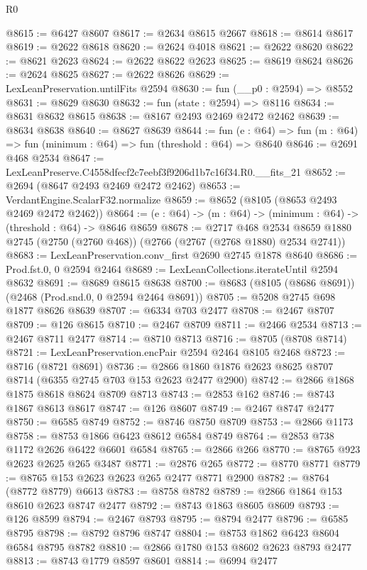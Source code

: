 \begin{lexlean}{R0}
\begin{coremodule}
@8615 := @6427 @8607
@8617 := @2634 @8615 @2667
@8618 := @8614 @8617
@8619 := @2622 @8618
@8620 := @2624 @4018
@8621 := @2622 @8620
@8622 := @8621 @2623
@8624 := @2622 @8622 @2623
@8625 := @8619 @8624
@8626 := @2624 @8625
@8627 := @2622 @8626
@8629 := LexLeanPreservation.untilFits @2594
@8630 := fun (__p0 : @2594) => @8552
@8631 := @8629 @8630
@8632 := fun (state : @2594) => @8116
@8634 := @8631 @8632 @8615
@8638 := @8167 @2493 @2469 @2472 @2462
@8639 := @8634 @8638
@8640 := @8627 @8639
@8644 := fun (e : @64) => fun (m : @64) => fun (minimum : @64) => fun (threshold : @64) => @8640
@8646 := @2691 @468 @2534
@8647 := LexLeanPreserve.C4558dfecf2c7eebf3f9206d1b7c16f34.R0.__fits_21
@8652 := @2694 (@8647 @2493 @2469 @2472 @2462)
@8653 := VerdantEngine.ScalarF32.normalize
@8659 := @8652 (@8105 (@8653 @2493 @2469 @2472 @2462))
@8664 := (e : @64) -> (m : @64) -> (minimum : @64) -> (threshold : @64) -> @8646 @8659
@8678 := @2717
    @468
    @2534
    @8659
    @1880
    @2745
    (@2750 (@2760 @468))
    (@2766 (@2767 (@2768 @1880) @2534 @2741))
@8683 := LexLeanPreservation.conv_first @2690 @2745 @1878 @8640
@8686 := Prod.fst.{0, 0} @2594 @2464
@8689 := LexLeanCollections.iterateUntil @2594 @8632
@8691 := @8689 @8615 @8638
@8700 := @8683 (@8105 (@8686 @8691)) (@2468 (Prod.snd.{0, 0} @2594 @2464 @8691))
@8705 := @5208 @2745 @698 @1877 @8626 @8639
@8707 := @6334 @703 @2477
@8708 := @2467 @8707
@8709 := @126 @8615
@8710 := @2467 @8709
@8711 := @2466 @2534
@8713 := @2467 @8711 @2477
@8714 := @8710 @8713
@8716 := @8705 (@8708 @8714)
@8721 := LexLeanPreservation.encPair @2594 @2464 @8105 @2468
@8723 := @8716 (@8721 @8691)
@8736 := @2866 @1860 @1876 @2623 @8625 @8707 @8714 (@6355 @2745 @703 @153 @2623 @2477 @2900)
@8742 := @2866 @1868 @1875 @8618 @8624 @8709 @8713
@8743 := @2853 @162
@8746 := @8743 @1867 @8613 @8617
@8747 := @126 @8607
@8749 := @2467 @8747 @2477
@8750 := @6585 @8749
@8752 := @8746 @8750 @8709
@8753 := @2866 @1173
@8758 := @8753 @1866 @6423 @8612 @6584 @8749
@8764 := @2853 @738 @1172 @2626 @6422 @6601 @6584
@8765 := @2866 @266
@8770 := @8765 @923 @2623 @2625 @265 @3487
@8771 := @2876 @265
@8772 := @8770 @8771
@8779 := @8765 @153 @2623 @2623 @265 @2477 @8771 @2900
@8782 := @8764 (@8772 @8779) @6613
@8783 := @8758 @8782
@8789 := @2866 @1864 @153 @8610 @2623 @8747 @2477
@8792 := @8743 @1863 @8605 @8609
@8793 := @126 @8599
@8794 := @2467 @8793
@8795 := @8794 @2477
@8796 := @6585 @8795
@8798 := @8792 @8796 @8747
@8804 := @8753 @1862 @6423 @8604 @6584 @8795 @8782
@8810 := @2866 @1780 @153 @8602 @2623 @8793 @2477
@8813 := @8743 @1779 @8597 @8601
@8814 := @6994 @2477

\end{coremodule}
\end{lexlean}
